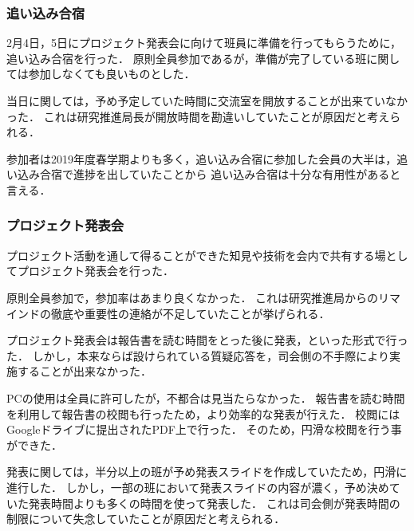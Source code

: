 \subsubsection*{追い込み合宿}
2月4日，5日にプロジェクト発表会に向けて班員に準備を行ってもらうために，追い込み合宿を行った．
原則全員参加であるが，準備が完了している班に関しては参加しなくても良いものとした．

当日に関しては，予め予定していた時間に交流室を開放することが出来ていなかった．
これは研究推進局長が開放時間を勘違いしていたことが原因だと考えられる．

参加者は2019年度春学期よりも多く，追い込み合宿に参加した会員の大半は，追い込み合宿で進捗を出していたことから
追い込み合宿は十分な有用性があると言える．

\subsubsection*{プロジェクト発表会}
プロジェクト活動を通して得ることができた知見や技術を会内で共有する場としてプロジェクト発表会を行った．

原則全員参加で，参加率はあまり良くなかった．
これは研究推進局からのリマインドの徹底や重要性の連絡が不足していたことが挙げられる．

プロジェクト発表会は報告書を読む時間をとった後に発表，といった形式で行った．
しかし，本来ならば設けられている質疑応答を，司会側の不手際により実施することが出来なかった．

PCの使用は全員に許可したが，不都合は見当たらなかった．
報告書を読む時間を利用して報告書の校閲も行ったため，より効率的な発表が行えた．
校閲にはGoogleドライブに提出されたPDF上で行った．
そのため，円滑な校閲を行う事ができた．

発表に関しては，半分以上の班が予め発表スライドを作成していたため，円滑に進行した．
しかし，一部の班において発表スライドの内容が濃く，予め決めていた発表時間よりも多くの時間を使って発表した．
これは司会側が発表時間の制限について失念していたことが原因だと考えられる．


